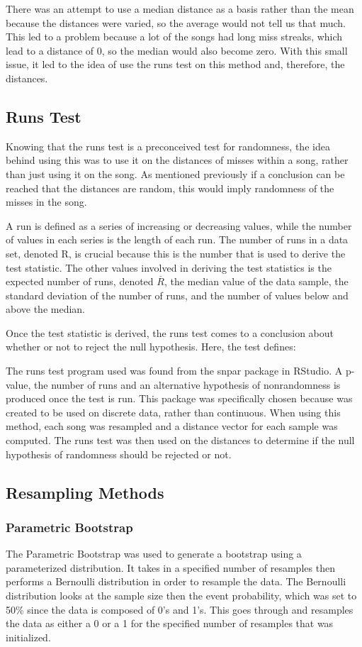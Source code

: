 \documentclass[12pt, letterpaper]{article}
\begin{document}
There was an attempt to use a median distance as a basis rather than the mean because the distances were varied, so the average would not tell us that much.  This led to a problem because a lot of the songs had long miss streaks, which lead to a distance of 0, so the median would also become zero.  With this small issue, it led to the idea of use the runs test on this method and, therefore, the distances.  

\subsection{Runs Test}
Knowing that the runs test is a preconceived test for randomness, the idea behind using this was to use it on the distances of misses within a song, rather than just using it on the song. As mentioned previously if a conclusion can be reached that the distances are random, this would imply randomness of the misses in the song. 

A run is defined as a series of increasing or decreasing values, while the number of values in each series is the length of each run. The number of runs in a data set, denoted R, is crucial because this is the number that is used to derive the test statistic. The other values involved in deriving the test statistics is the expected number of runs, denoted $\overline{R}$, the median value of the data sample, the standard deviation of the number of runs, and the number of values below and above the median. 

Once the test statistic is derived, the runs test comes to a conclusion about whether or not to reject the null hypothesis. Here, the test defines: 


The runs test program used was found from the snpar package in RStudio. A p-value, the number of runs and an alternative hypothesis of nonrandomness is produced once the test is run. This package was specifically chosen because was created to be used on discrete data, rather than continuous. When using this method, each song was resampled and a distance vector for each sample was computed. The runs test was then used on the distances to determine if the null hypothesis of randomness should be rejected or not. 

\subsection{Resampling Methods}
\subsubsection{Parametric Bootstrap}
The Parametric Bootstrap was used to generate a bootstrap using a parameterized distribution.  It takes in a specified number of resamples then performs a Bernoulli distribution in order to resample the data.  The Bernoulli distribution looks at the sample size then the event probability, which was set to 50\% since the data is composed of 0's and 1's.  This goes through and resamples the data as either a 0 or a 1 for the specified number of resamples that was initialized.   
\end{document}
